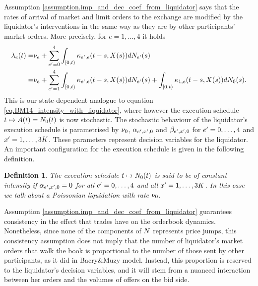 \documentclass[10pt]{article}
\newtheorem{defi}[thm]{Definition}
\begin{document}
Assumption \ref{assumption.imp_and_dec_coef_from_liquidator} says that the rates of arrival of market and limit orders to the exchange are modified by the liquidator's interventions in the same way as they are by other participants' market orders. More precisely, for $e=1,\dots,4$ it holds 
\begin{equation}\label{eq.intensities_when_liquidator_is_present}
\begin{split}
\intensity[e](t) =& \baseRate_e 
 + \sum_{\eone = 0}^{4}\int_{[0,t)} \hawkesKernel_{\eone,e}(t-s,\stateVariable(s))d\countingProc[\eone](s)
 \\
 =& \baseRate_e 
 + \sum_{\eone = 1}^{4}\int_{[0,t)} \hawkesKernel_{\eone,e}(t-s,\stateVariable(s))d\countingProc[\eone](s)
 + \int_{[0,t)} \hawkesKernel_{1,e}(t-s,\stateVariable(s))d\countingProc[0](s).
 \end{split}
\end{equation}
This is our state-dependent analogue to equation \eqref{eq.BM14_intensity_with_liquidator}, where however the execution schedule $t \mapsto A(t)=\countingProc[0](t)$ is now stochastic. The stochastic behaviour of the liquidator's execution schedule is parametrised by $\baseRate_0$, $\impCoef_{\eone,\xone,0}$ and $\decCoef_{\eone,\xone,0}$ for $\eone = 0,\dots,4$ and $\xone=1,\dots,3K$. These parameters represent decision variables for the liquidator. An important configuration for the execution schedule is given in the following definition. 
\begin{defi}\label{def.poissonina_liquidation}
The execution schedule $t \mapsto \countingProc[0](t)$ is said to be of constant intensity if $\impCoef_{\eone,\xone,0} = 0$ for all $\eone = 0,\dots,4$ and all $\xone=1,\dots,3K$. In this case we talk about a Poissonian liquidation with rate $\baseRate_0$. 
\end{defi}

Assumption \ref{assumption.imp_and_dec_coef_from_liquidator} guarantees consistency in the effect that trades have on the orderbook dynamics. Nonetheless, since none of the components of $\multiCountingProc$ represents price jumps, this consistency assumption does not imply that the number of liquidator's market orders that  walk the book  is proportional to the number of those sent by other participants, as it did in Bacry\&Muzy model. Instead, this proportion is reserved to the liquidator's decision variables, and it will stem from a nuanced interaction between her orders and the volumes of offers on the bid side. 
\end{document}
